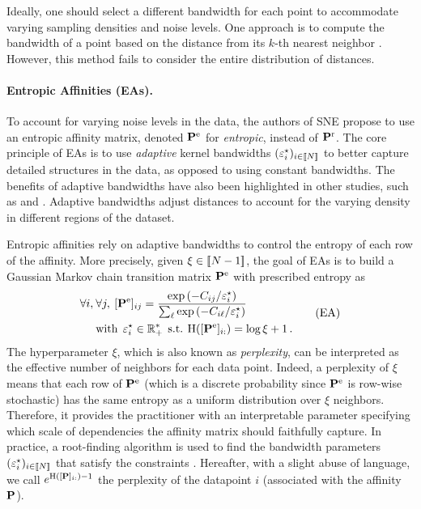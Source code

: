 Ideally, one should select a different bandwidth for each point to accommodate varying sampling densities and noise levels. One approach is to compute the bandwidth of a point based on the distance from its $k$-th nearest neighbor \citep{zelnik2004self}. However, this method fails to consider the entire distribution of distances.

\paragraph{Entropic Affinities (EAs).}
To account for varying noise levels in the data, the authors of SNE propose to use an entropic affinity matrix, denoted ${\mathbf{P}}^{\mathrm{e}}$ for \emph{entropic}, instead of ${\mathbf{P}}^{\mathrm{r}}$. The core principle of EAs \citep{hinton2002stochastic} is to use \emph{adaptive} kernel bandwidths $(\varepsilon^\star_i)_{i \in {[\![N]\!]}}$ to better capture detailed structures in the data, as opposed to using constant bandwidths. The benefits of adaptive bandwidths have also been highlighted in other studies, such as \citep{van2018recovering} and \citep{zelnik2004self}. Adaptive bandwidths adjust distances to account for the varying density in different regions of the dataset.

Entropic affinities rely on adaptive bandwidths to control the entropy of each row of the affinity. More precisely, given $\xi \in {[\![N-1]\!]}$, the goal of EAs is to build a Gaussian Markov chain transition matrix ${\mathbf{P}}^{\mathrm{e}}$ with prescribed entropy as
\begin{equation}
\begin{split}
    \forall i, \: &\forall j, \: [{\mathbf{P}}^{\mathrm{e}}]_{ij} = \frac{\exp{(-C_{ij}/\varepsilon^\star_i)}}{\sum_\ell \exp{(-C_{i\ell}/\varepsilon^\star_i)}} \\
    &\text{with} \:\: \varepsilon^\star_i \in \mathbb{R}^*_+ \:\: \text{s.t.} \: \operatorname{H}([{\mathbf{P}}^{\mathrm{e}}]_{i:}) = \log{\xi} + 1\,. \label{eq:entropic_affinity_pb}
\end{split}\tag{EA}
\end{equation}
The hyperparameter $\xi$, which is also known as \emph{perplexity}, can be interpreted as the effective number of neighbors for each data point. Indeed, a perplexity of $\xi$ means that each row of ${\mathbf{P}}^{\mathrm{e}}$ (which is a discrete probability since ${\mathbf{P}}^{\mathrm{e}}$ is row-wise stochastic) has the same entropy as a uniform distribution over $\xi$ neighbors. Therefore, it provides the practitioner with an interpretable parameter specifying which scale of dependencies the affinity matrix should faithfully capture. In practice, a root-finding algorithm is used to find the bandwidth parameters $(\varepsilon_i^\star)_{i \in {[\![N]\!]}}$ that satisfy the constraints \citep{vladymyrov2013entropic}. Hereafter, with a slight abuse of language, we call $e^{\operatorname{H}([{\mathbf{P}}]_{i:})-1}$ the perplexity of the datapoint $i$ (associated with the affinity ${\mathbf{P}}$).


